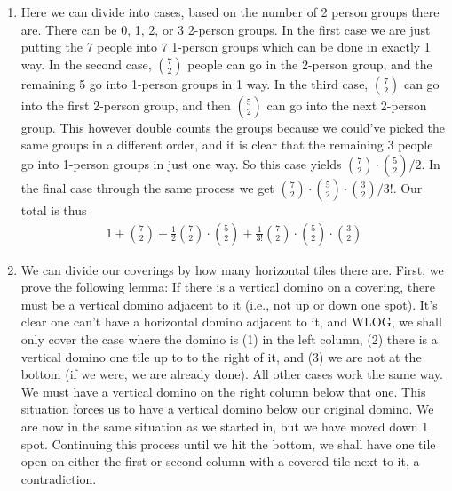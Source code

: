 \documentclass[12pt]{article}
\theoremstyle{definition}
\theoremstyle{remark}
\begin{document}
\begin{enumerate}[leftmargin=\labelsep]
		\newpage
		\item Here we can divide into cases, based on the number of 2 person groups there are. There can be 0, 1, 2, or 3 2-person groups. In the first case we are just putting the 7 people into 7 1-person groups which can be done in exactly 1 way. In the second case, ${7 \choose 2}$ people can go in the 2-person group, and the remaining 5 go into 1-person groups in 1 way. In the third case, ${7 \choose 2}$ can go into the first 2-person group, and then ${5 \choose 2}$ can go into the next 2-person group. This however double counts the groups because we could've picked the same groups in a different order, and it is clear that the remaining 3 people go into 1-person groups in just one way. So this case yields ${7 \choose 2} \cdot {5 \choose 2}/2$. In the final case through the same process we get ${7 \choose 2} \cdot {5 \choose 2} \cdot {3 \choose 2} / 3!$. Our total is thus
		\begin{align*}
			\boxed{1+{7 \choose 2} + \frac12 {7 \choose 2} \cdot {5 \choose 2} + \frac1{3!} {7 \choose 2} \cdot {5 \choose 2} \cdot {3 \choose 2}}
		\end{align*}
	
		\newpage
		\item We can divide our coverings by how many horizontal tiles there are. First, we prove the following lemma:
		If there is a vertical domino on a covering, there must be a vertical domino adjacent to it (i.e., not up or down one spot). It's clear one can't have a horizontal domino adjacent to it, and WLOG, we shall only cover the case where the domino is (1) in the left column, (2) there is a vertical domino one tile up to to the right of it, and (3) we are not at the bottom (if we were, we are already done). All other cases work the same way. We must have a vertical domino on the right column below that one. This situation forces us to have a vertical domino below our original domino. We are now in the same situation as we started in, but we have moved down 1 spot. Continuing this process until we hit the bottom, we shall have one tile open on either the first or second column with a covered tile next to it, a contradiction. 
		

\end{enumerate}
\end{document}

